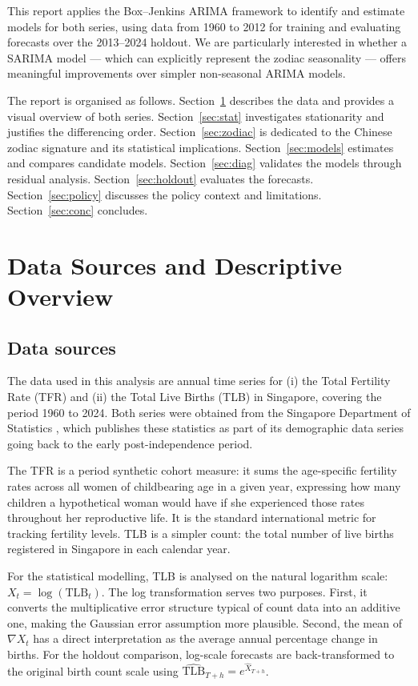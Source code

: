 \documentclass[12pt,a4paper]{article}
\begin{document}
This report applies the Box--Jenkins ARIMA framework \citep{box2015} to identify
and estimate models for both series, using data from 1960 to 2012 for training and
evaluating forecasts over the 2013--2024 holdout. We are particularly interested in
whether a SARIMA model --- which can explicitly represent the zodiac seasonality ---
offers meaningful improvements over simpler non-seasonal ARIMA models.

The report is organised as follows. Section~\ref{sec:data} describes the data and
provides a visual overview of both series. Section~\ref{sec:stat} investigates
stationarity and justifies the differencing order. Section~\ref{sec:zodiac}
is dedicated to the Chinese zodiac signature and its statistical implications.
Section~\ref{sec:models} estimates and compares candidate models. Section~\ref{sec:diag}
validates the models through residual analysis. Section~\ref{sec:holdout} evaluates
the forecasts. Section~\ref{sec:policy} discusses the policy context and limitations.
Section~\ref{sec:conc} concludes.

\section{Data Sources and Descriptive Overview}
\label{sec:data}

\subsection{Data sources}

The data used in this analysis are annual time series for (i) the Total Fertility
Rate (TFR) and (ii) the Total Live Births (TLB) in Singapore, covering the period
1960 to 2024. Both series were obtained from the Singapore Department of Statistics
\citep{singstat2025}, which publishes these statistics as part of its demographic
data series going back to the early post-independence period.

The TFR is a period synthetic cohort measure: it sums the age-specific fertility rates
across all women of childbearing age in a given year, expressing how many children a
hypothetical woman would have if she experienced those rates throughout her
reproductive life. It is the standard international metric for tracking fertility
levels. TLB is a simpler count: the total number of live births registered in
Singapore in each calendar year.

For the statistical modelling, TLB is analysed on the natural logarithm scale:
$X_t = \log(\text{TLB}_t)$. The log transformation serves two purposes. First,
it converts the multiplicative error structure typical of count data into an additive
one, making the Gaussian error assumption more plausible. Second, the mean of
$\nabla X_t$ has a direct interpretation as the average annual percentage change in
births. For the holdout comparison, log-scale forecasts are back-transformed to
the original birth count scale using $\widehat{\text{TLB}}_{T+h} = e^{\hat{X}_{T+h}}$.
\end{document}
